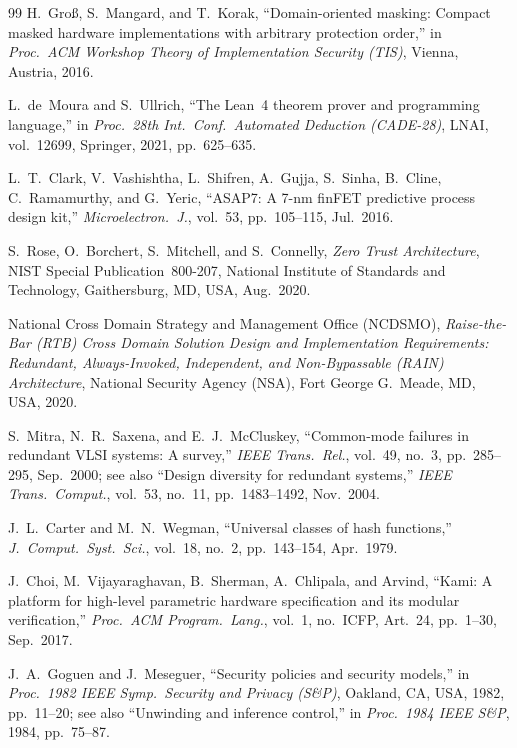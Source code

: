\documentclass[10pt,twocolumn]{article}
\theoremstyle{spectralthm}
\begin{document}
\begin{thebibliography}{99}
H.~Gro\ss, S.~Mangard, and T.~Korak, ``Domain-oriented masking: Compact masked hardware implementations with arbitrary protection order,'' in \textit{Proc.\ ACM Workshop Theory of Implementation Security (TIS)}, Vienna, Austria, 2016.

L.~de~Moura and S.~Ullrich, ``The Lean~4 theorem prover and programming language,'' in \textit{Proc.\ 28th Int.\ Conf.\ Automated Deduction (CADE-28)}, LNAI, vol.~12699, Springer, 2021, pp.~625--635.

L.~T.~Clark, V.~Vashishtha, L.~Shifren, A.~Gujja, S.~Sinha, B.~Cline, C.~Ramamurthy, and G.~Yeric, ``ASAP7: A 7-nm finFET predictive process design kit,'' \textit{Microelectron.\ J.}, vol.~53, pp.~105--115, Jul.\ 2016.

S.~Rose, O.~Borchert, S.~Mitchell, and S.~Connelly, \textit{Zero Trust Architecture}, NIST Special Publication~800-207, National Institute of Standards and Technology, Gaithersburg, MD, USA, Aug.\ 2020.

National Cross Domain Strategy and Management Office (NCDSMO), \textit{Raise-the-Bar (RTB) Cross Domain Solution Design and Implementation Requirements: Redundant, Always-Invoked, Independent, and Non-Bypassable (RAIN) Architecture}, National Security Agency (NSA), Fort George G.\ Meade, MD, USA, 2020.

S.~Mitra, N.~R.~Saxena, and E.~J.~McCluskey, ``Common-mode failures in redundant VLSI systems: A survey,'' \textit{IEEE Trans.\ Rel.}, vol.~49, no.~3, pp.~285--295, Sep.\ 2000; see also ``Design diversity for redundant systems,'' \textit{IEEE Trans.\ Comput.}, vol.~53, no.~11, pp.~1483--1492, Nov.\ 2004.

J.~L.~Carter and M.~N.~Wegman, ``Universal classes of hash functions,'' \textit{J.\ Comput.\ Syst.\ Sci.}, vol.~18, no.~2, pp.~143--154, Apr.\ 1979.

J.~Choi, M.~Vijayaraghavan, B.~Sherman, A.~Chlipala, and Arvind, ``Kami: A platform for high-level parametric hardware specification and its modular verification,'' \textit{Proc.\ ACM Program.\ Lang.}, vol.~1, no.~ICFP, Art.~24, pp.~1--30, Sep.\ 2017.

J.~A.~Goguen and J.~Meseguer, ``Security policies and security models,'' in \textit{Proc.\ 1982 IEEE Symp.\ Security and Privacy (S\&P)}, Oakland, CA, USA, 1982, pp.~11--20; see also ``Unwinding and inference control,'' in \textit{Proc.\ 1984 IEEE S\&P}, 1984, pp.~75--87.


\end{thebibliography}
\end{document}
